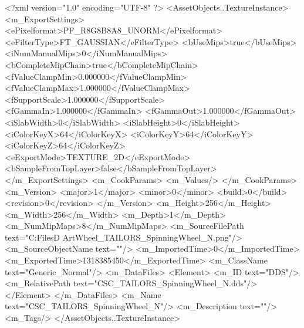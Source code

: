 <?xml version="1.0" encoding="UTF-8" ?>
<AssetObjects..TextureInstance>
	<m_ExportSettings>
		<ePixelformat>PF_R8G8B8A8_UNORM</ePixelformat>
		<eFilterType>FT_GAUSSIAN</eFilterType>
		<bUseMips>true</bUseMips>
		<iNumManualMips>0</iNumManualMips>
		<bCompleteMipChain>true</bCompleteMipChain>
		<fValueClampMin>0.000000</fValueClampMin>
		<fValueClampMax>1.000000</fValueClampMax>
		<fSupportScale>1.000000</fSupportScale>
		<fGammaIn>1.000000</fGammaIn>
		<fGammaOut>1.000000</fGammaOut>
		<iSlabWidth>0</iSlabWidth>
		<iSlabHeight>0</iSlabHeight>
		<iColorKeyX>64</iColorKeyX>
		<iColorKeyY>64</iColorKeyY>
		<iColorKeyZ>64</iColorKeyZ>
		<eExportMode>TEXTURE_2D</eExportMode>
		<bSampleFromTopLayer>false</bSampleFromTopLayer>
	</m_ExportSettings>
	<m_CookParams>
		<m_Values/>
	</m_CookParams>
	<m_Version>
		<major>1</major>
		<minor>0</minor>
		<build>0</build>
		<revision>0</revision>
	</m_Version>
	<m_Height>256</m_Height>
	<m_Width>256</m_Width>
	<m_Depth>1</m_Depth>
	<m_NumMipMaps>8</m_NumMipMaps>
	<m_SourceFilePath text="C:\Users\Shadow\Desktop\Working Files\3D Art\Props\Tailors\Spinning Wheel\CSC_TAILORS_SpinningWheel_N.png"/>
	<m_SourceObjectName text=""/>
	<m_ImportedTime>0</m_ImportedTime>
	<m_ExportedTime>1318385450</m_ExportedTime>
	<m_ClassName text="Generic_Normal"/>
	<m_DataFiles>
		<Element>
			<m_ID text="DDS"/>
			<m_RelativePath text="CSC_TAILORS_SpinningWheel_N.dds"/>
		</Element>
	</m_DataFiles>
	<m_Name text="CSC_TAILORS_SpinningWheel_N"/>
	<m_Description text=""/>
	<m_Tags/>
</AssetObjects..TextureInstance>


